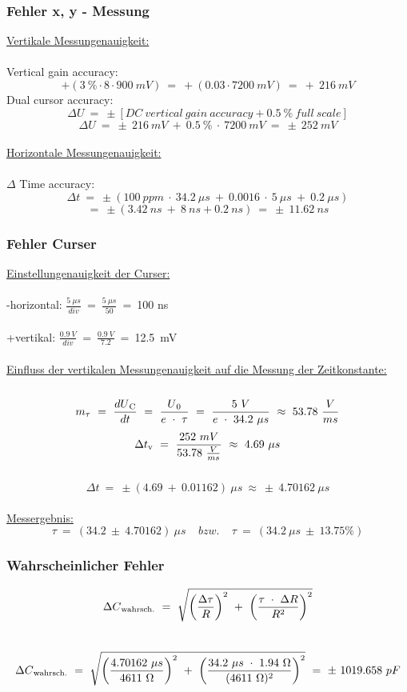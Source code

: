 \documentclass[a4paper,12pt]{article}
\begin{document}
\subsubsection* {Fehler x, y - Messung}
\underline{Vertikale Messungenauigkeit:}\\\\
Vertical gain accuracy: 
\[
+(3~\% \cdot 8 \cdot 900~mV)~=~+( 0.03 \cdot 7200~mV)~=~+~216~mV
\]
Dual cursor accuracy: 
\[
\Delta U~=~\pm[DC~vertical~gain~accuracy + 0.5~\%~full~scale]
\]
\[
\Delta U~=~\pm~216~mV~+~0.5~\%~\cdot~7200~mV~=~\pm~252~mV
\]
\\
\noindent \underline{Horizontale Messungenauigkeit:}\\\\
$\Delta$ Time accuracy:
\[
\Delta t~=~\pm(100~ppm~\cdot~34.2~\mu s~+~0.0016~\cdot~5~\mu s~+~0.2~\mu s)
\]
\[
=~\pm(3.42~ns~+~8~ns+0.2~ns)~=~\pm~11.62~ns
\]

\subsubsection* {Fehler Curser}
\underline{Einstellungenauigkeit der Curser:}\\\\
-horizontal: \(\frac{5~\mu s}{div}\)~=~\(\frac{5~\mu s}{50}\)~=~100 ns\\\\
+vertikal: \(\frac{0.9~V}{div}\)~=~\(\frac{0.9~V}{7.2}\)~=~12.5~mV\\\\
\underline{Einfluss der vertikalen Messungenauigkeit auf die Messung der Zeitkonstante:}\\\\
\[
m\textsubscript{$\tau$}~=~\frac{dU\textsubscript{C}}{dt}~=~\frac{U\textsubscript{0}}{e~\cdot~\tau}~=~\frac{5~V}{e~\cdot~34.2~\mu s}~\approx~53.78~\frac{V}{ms}
\]
\[
\Delta t\textsubscript{v}~=~\frac{252~mV}{53.78~\frac{V}{ms}}~\approx~4.69~\mu s
\]\\
\[
\Delta t~=~\pm(4.69~+~ 0.01162)~\mu s~\approx~\pm~4.70162~\mu s
\]\\
\underline{Messergebnis:}
\[
\tau~=~(34.2~\pm~4.70162)~\mu s~~~~~bzw.~~~~~\tau~=~(34.2~\mu s~\pm~13.75\%)
\]
\subsubsection* {Wahrscheinlicher Fehler}
\[
\Delta C\textsubscript{wahrsch.}~=~\sqrt{\left(\frac{\Delta \tau}{R}\right)^2~+~\left(\frac{\tau~\cdot~\Delta R}{R^2}\right)^2}
\]\\
\[
\Delta C\textsubscript{wahrsch.}~=~\sqrt{\left(\frac{4.70162~\mu s}{4611~\Omega}\right)^2~+~\left(\frac{34.2~\mu s~\cdot~1.94~\Omega}{(4611~\Omega)^2}\right)^2}~=~\pm~1019.658~ pF
\]
\end{document}
